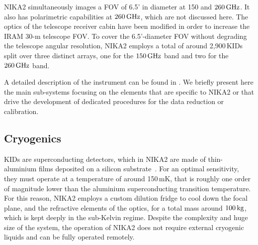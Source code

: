 
NIKA2 simultaneously images a FOV of
6.5' in diameter at 150 and $260\,\rm{GHz}$. It also has polarimetric
capabilities at  $260\,\rm{GHz}$, which are not discussed here. The
optics of the telescope receiver cabin have been modified in order
to increase the IRAM 30-m telescope FOV.
To cover the 6.5'-diameter FOV without degrading the
telescope angular resolution, NIKA2 employs a total of around
2,900\,KIDs split over three distinct arrays, one for the $150\,\rm{GHz}$
band and two for the $260\,\rm{GHz}$ band.

A detailed description of the instrument can be found in
\citet{Adam2018}. We briefly present here the main sub-systems
focusing on the elements that are specific to NIKA2
or that drive the development of dedicated procedures for the data
reduction or calibration.


\subsection{Cryogenics}

{\lp KIDs are superconducting detectors, which in NIKA2 are made of
thin-aluminium films deposited on a silicon substrate~\citep{Roesch2012_LEKID}.
For an optimal sensitivity, they must operate at a temperature of
around 150\,mK, that is roughly one order of magnitude lower than the
aluminium superconducting transition temperature.}  
For this reason,
NIKA2 employs a custom dilution fridge to cool down the focal plane, and the
refractive elements of the optics, for a total mass around $100\, \rm{kg}$,
which is kept deeply in the sub-Kelvin regime. Despite the complexity
and huge size of the system, the operation of NIKA2 does not require
external cryogenic liquids and can be fully operated remotely.


